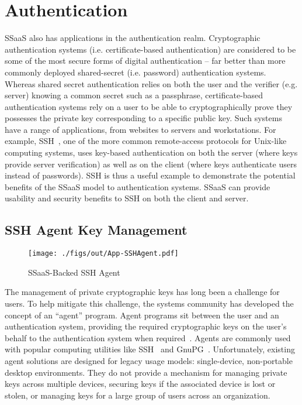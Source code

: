 \section{Authentication}

SSaaS also has applications in the authentication realm. Cryptographic
authentication systems (i.e. certificate-based authentication) are
considered to be some of the most secure forms of digital
authentication -- far better than more commonly deployed shared-secret
(i.e. password) authentication systems. Whereas shared secret
authentication relies on both the user and the verifier (e.g. server)
knowing a common secret such as a passphrase, certificate-based
authentication systems rely on a user to be able to cryptographically
prove they possesses the private key corresponding to a specific
public key. Such systems have a range of applications, from websites
to servers and workstations. For example, SSH~\cite{ylonen1996}, one
of the more common remote-access protocols for Unix-like computing
systems, uses key-based authentication on both the server (where keys
provide server verification) as well as on the client (where keys
authenticate users instead of passwords). SSH is thus a useful example
to demonstrate the potential benefits of the SSaaS model to
authentication systems. SSaaS can provide usability and security
benefits to SSH on both the client and server.

\subsection{SSH Agent Key Management}

\begin{figure}[t]
  \centering
  \texttt{[image: ./figs/out/App-SSHAgent.pdf]}
  \caption{SSaaS-Backed SSH Agent}
  \label{fig:app-sshagent}
\end{figure}

The management of private cryptographic keys has long been a challenge
for users. To help mitigate this challenge, the systems community has
developed the concept of an ``agent'' program. Agent programs sit
between the user and an authentication system, providing the required
cryptographic keys on the user's behalf to the authentication system
when required~\cite{cox2002}. Agents are commonly used with popular
computing utilities like SSH~\cite{ylonen1996} and
GnuPG~\cite{gnupg}. Unfortunately, existing agent solutions are
designed for legacy usage models: single-device, non-portable desktop
environments. They do not provide a mechanism for managing private
keys across multiple devices, securing keys if the associated device
is lost or stolen, or managing keys for a large group of users across
an organization.

